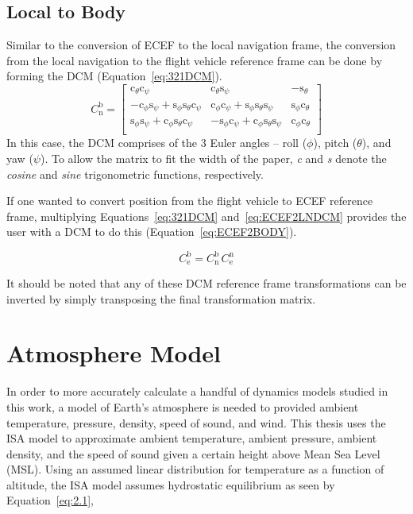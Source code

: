 \subsection{\textbf{Local to Body}}
Similar to the conversion of ECEF to the local navigation frame, the conversion from the local navigation to the flight vehicle reference frame can be done by forming the DCM (Equation~\ref{eq:321DCM}).
\begin{equation}\label{eq:321DCM}
    C^{\textrm{b}}_{\textrm{n}} =
    \begin{bmatrix}
        \textrm{c}_{\theta}\textrm{c}_{\psi}                                                        & \textrm{c}_{\theta}\textrm{s}_{\psi}                                                        & -\textrm{s}_{\theta}                 \\
        -\textrm{c}_{\phi}\textrm{s}_{\psi} + \textrm{s}_{\phi}\textrm{s}_{\theta}\textrm{c}_{\psi} & \textrm{c}_{\phi}\textrm{c}_{\psi} + \textrm{s}_{\phi}\textrm{s}_{\theta}\textrm{s}_{\psi}  & \textrm{s}_{\phi}\textrm{c}_{\theta} \\
        \textrm{s}_{\phi}\textrm{s}_{\psi} + \textrm{c}_{\phi}\textrm{s}_{\theta}\textrm{c}_{\psi}  & -\textrm{s}_{\phi}\textrm{c}_{\psi} + \textrm{c}_{\phi}\textrm{s}_{\theta}\textrm{s}_{\psi} & \textrm{c}_{\phi}\textrm{c}_{\theta} \\
    \end{bmatrix}
\end{equation}
In this case, the DCM comprises of the 3 Euler angles {--} roll (\( \phi \)), pitch (\( \theta \)), and yaw (\( \psi \)). To allow the matrix to fit the width of the paper, \textit{c} and \textit{s} denote the \textit{cosine} and \textit{sine} trigonometric functions, respectively.

If one wanted to convert position from the flight vehicle to ECEF reference frame, multiplying Equations~\ref{eq:321DCM} and~\ref{eq:ECEF2LNDCM} provides the user with a DCM to do this (Equation~\ref{eq:ECEF2BODY}).

\begin{equation}\label{eq:ECEF2BODY}
    C^{\textrm{b}}_{\textrm{e}} = C^{\textrm{b}}_{\textrm{n}} \, C^{\textrm{n}}_{\textrm{e}}
\end{equation}

It should be noted that any of these DCM reference frame transformations can be inverted by simply transposing the final transformation matrix.

\section{\textbf{Atmosphere Model}}\label{section:atmos}
In order to more accurately calculate a handful of dynamics models studied in this work, a model of Earth's atmosphere is needed to provided ambient temperature, pressure, density, speed of sound, and wind. This thesis uses the ISA model to approximate ambient temperature, ambient pressure, ambient density, and the speed of sound given a certain height above Mean Sea Level (MSL). Using an assumed linear distribution for temperature as a function of altitude, the ISA model assumes hydrostatic equilibrium as seen by Equation~\ref{eq:2.1},


